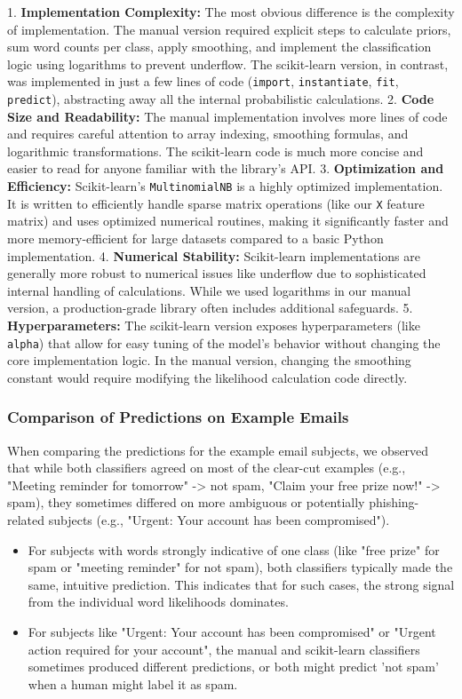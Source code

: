 \documentclass[12pt,a4paper]{article}
\begin{document}
1.  \textbf{Implementation Complexity:} The most obvious difference is the complexity of implementation. The manual version required explicit steps to calculate priors, sum word counts per class, apply smoothing, and implement the classification logic using logarithms to prevent underflow. The scikit-learn version, in contrast, was implemented in just a few lines of code (\texttt{import}, \texttt{instantiate}, \texttt{fit}, \texttt{predict}), abstracting away all the internal probabilistic calculations.
2.  \textbf{Code Size and Readability:} The manual implementation involves more lines of code and requires careful attention to array indexing, smoothing formulas, and logarithmic transformations. The scikit-learn code is much more concise and easier to read for anyone familiar with the library's API.
3.  \textbf{Optimization and Efficiency:} Scikit-learn's \texttt{MultinomialNB} is a highly optimized implementation. It is written to efficiently handle sparse matrix operations (like our \texttt{X} feature matrix) and uses optimized numerical routines, making it significantly faster and more memory-efficient for large datasets compared to a basic Python implementation.
4.  \textbf{Numerical Stability:} Scikit-learn implementations are generally more robust to numerical issues like underflow due to sophisticated internal handling of calculations. While we used logarithms in our manual version, a production-grade library often includes additional safeguards.
5.  \textbf{Hyperparameters:} The scikit-learn version exposes hyperparameters (like \texttt{alpha}) that allow for easy tuning of the model's behavior without changing the core implementation logic. In the manual version, changing the smoothing constant would require modifying the likelihood calculation code directly.

\subsubsection{Comparison of Predictions on Example Emails}

When comparing the predictions for the example email subjects, we observed that while both classifiers agreed on most of the clear-cut examples (e.g., "Meeting reminder for tomorrow" -> not spam, "Claim your free prize now!" -> spam), they sometimes differed on more ambiguous or potentially phishing-related subjects (e.g., "Urgent: Your account has been compromised").

\begin{itemize}
    \item For subjects with words strongly indicative of one class (like "free prize" for spam or "meeting reminder" for not spam), both classifiers typically made the same, intuitive prediction. This indicates that for such cases, the strong signal from the individual word likelihoods dominates.
    \item For subjects like "Urgent: Your account has been compromised" or "Urgent action required for your account", the manual and scikit-learn classifiers sometimes produced different predictions, or both might predict 'not spam' when a human might label it as spam.
\end{itemize}
\end{document}
